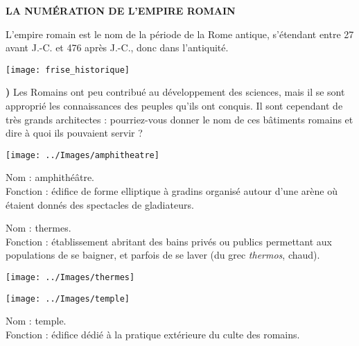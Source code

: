 \documentclass[12pt,a4paper]{article}
\begin{document}
\pagebreak
\thispagestyle{empty}

\begin{center}
   \bf LA NUMÉRATION DE L'EMPIRE ROMAIN \\ [1cm]
\end{center}
   
\noindent L'empire romain est le nom de la période de la Rome antique, s'étendant entre 27 avant J.-C. et 476 après J.-C., donc dans l'antiquité.

\begin{center}
   \texttt{[image: frise\_historique]}
\end{center}

{\bf{})} Les Romains ont peu contribué au développement des sciences, mais il se sont approprié les connaissances des peuples qu'ils ont conquis. Il sont cependant de très grands architectes : pourriez-vous donner le nom de ces bâtiments romains et dire à quoi ils pouvaient servir ? \\
   
\begin{minipage}{6cm}
   \texttt{[image: ../Images/amphitheatre]}
\end{minipage}
\qquad
\begin{minipage}{10cm}
   Nom : {\red amphithéâtre.} \\ [3mm]
   Fonction : {\red édifice de forme elliptique à gradins organisé autour d'une arène où étaient donnés des spectacles de gladiateurs.}
\end{minipage}

\bigskip

\begin{minipage}{11cm}
   Nom : {\red thermes.} \\ [3mm]
   Fonction : {\red établissement abritant des bains privés ou publics permettant aux populations de se baigner, et parfois de se laver (du grec {\it thermos}, chaud).}
\end{minipage}
\qquad
\begin{minipage}{5cm}
   \texttt{[image: ../Images/thermes]}
\end{minipage}

\bigskip

\begin{minipage}{4.5cm}
   \texttt{[image: ../Images/temple]}
\end{minipage}
\qquad
\begin{minipage}{11.5cm}
   Nom : {\red temple.} \\ [3mm]
   Fonction : {\red édifice dédié à la pratique extérieure du culte des romains.}
\end{minipage}
\end{document}
